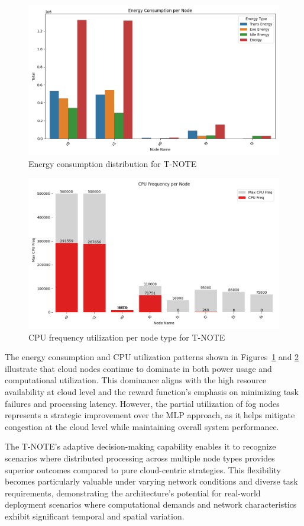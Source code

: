 \documentclass[preprint,3p,authoryear]{elsarticle}
\begin{document}
\begin{figure}[H]
    \centering
    \includegraphics[width=0.5\linewidth]{figs/T-NOTE/energy_consumption_per_node.png}
    \caption{Energy consumption distribution for T-NOTE}
    \label{fig:T-NOTE-energy-consumption}
\end{figure}

\begin{figure}[H]
    \centering
    \includegraphics[width=0.5\linewidth]{figs/T-NOTE/cpu_frequency_per_node.png}
    \caption{CPU frequency utilization per node type for T-NOTE}
    \label{fig:T-NOTE-cpu-frequency}
\end{figure}

The energy consumption and CPU utilization patterns shown in Figures~\ref{fig:T-NOTE-energy-consumption} and \ref{fig:T-NOTE-cpu-frequency} illustrate that cloud nodes continue to dominate in both power usage and computational utilization. This dominance aligns with the high resource availability at cloud level and the reward function's emphasis on minimizing task failures and processing latency. However, the partial utilization of fog nodes represents a strategic improvement over the MLP approach, as it helps mitigate congestion at the cloud level while maintaining overall system performance.

The T-NOTE's adaptive decision-making capability enables it to recognize scenarios where distributed processing across multiple node types provides superior outcomes compared to pure cloud-centric strategies. This flexibility becomes particularly valuable under varying network conditions and diverse task requirements, demonstrating the architecture's potential for real-world deployment scenarios where computational demands and network characteristics exhibit significant temporal and spatial variation.
\end{document}
